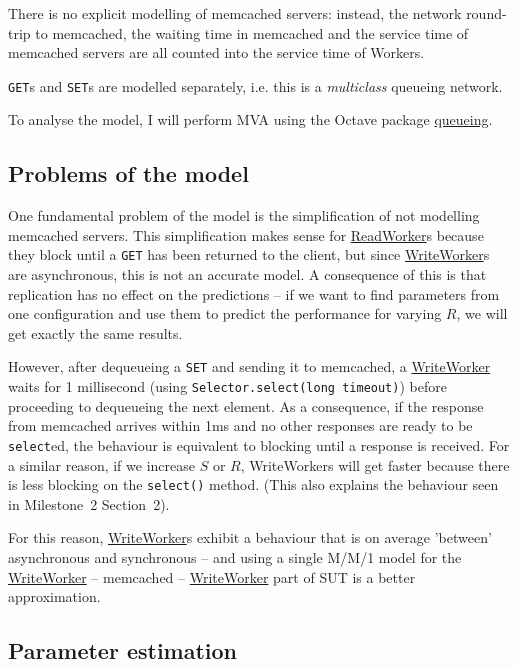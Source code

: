 \documentclass[11pt]{article}
\newcommand{\get}[0]{\texttt{GET}}
\newcommand{\set}[0]{\texttt{SET}}
\newcommand{\linkmain}[1]{\href{https://gitlab.inf.ethz.ch/pungast/asl-fall16-project/blob/master/src/main/java/asl/#1.java}{#1}}
\begin{document}
There is no explicit modelling of memcached servers: instead, the network round-trip to memcached, the waiting time in memcached and the service time of memcached servers are all counted into the service time of Workers.

\get{}s and \set{}s are modelled separately, i.e. this is a \emph{multiclass} queueing network.

To analyse the model, I will perform MVA using the Octave package \href{http://www.moreno.marzolla.name/software/queueing/queueing.html}{queueing}.

\subsection{Problems of the model}
\label{sec:part3:problems}

One fundamental problem of the model is the simplification of not modelling memcached servers. This simplification makes sense for \linkmain{ReadWorker}s because they block until a \get{} has been returned to the client, but since \linkmain{WriteWorker}s are asynchronous, this is not an accurate model. A consequence of this is that replication has no effect on the predictions -- if we want to find parameters from one configuration and use them to predict the performance for varying $R$, we will get exactly the same results.

However, after dequeueing a \set{} and sending it to memcached, a \linkmain{WriteWorker} waits for 1 millisecond (using \texttt{Selector.select(long timeout)}) before proceeding to dequeueing the next element. As a consequence, if the response from memcached arrives within 1ms and no other responses are ready to be \texttt{select}ed, the behaviour is equivalent to blocking until a response is received. For a similar reason, if we increase $S$ or $R$, WriteWorkers will get faster because there is less blocking on the \texttt{select()} method. (This also explains the behaviour seen in Milestone~2 Section~2).

For this reason, \linkmain{WriteWorker}s exhibit a behaviour that is on average 'between' asynchronous and synchronous -- and using a single M/M/1 model for the \linkmain{WriteWorker} -- memcached -- \linkmain{WriteWorker} part of SUT is a better approximation.


\subsection{Parameter estimation}
\end{document}
